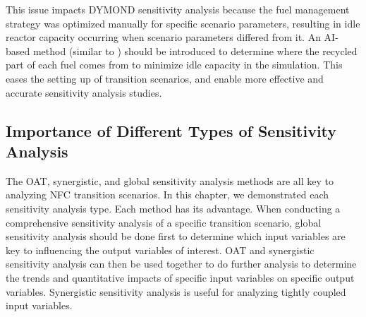 This issue impacts DYMOND sensitivity analysis 
because the fuel management strategy was 
optimized manually for specific scenario parameters, resulting in 
idle reactor capacity occurring when scenario parameters differed 
from it. 
An AI-based method (similar to \deploy) 
should be introduced to 
determine where the recycled part of each fuel comes from to 
minimize idle capacity in the simulation. 
This eases the setting up of transition scenarios, and enable 
more effective and accurate sensitivity analysis studies.

\subsection{Importance of Different Types of Sensitivity Analysis}
The OAT, synergistic, and global sensitivity analysis methods 
are all key to analyzing \gls{NFC} transition scenarios. 
In this chapter, we demonstrated each sensitivity analysis type. 
Each method has its advantage. 
When conducting a comprehensive sensitivity analysis of a specific 
transition scenario, 
global sensitivity analysis should be done first to 
determine which input variables are key to influencing the output 
variables of interest. 
OAT and synergistic sensitivity analysis can then be used together to 
do further analysis to determine the trends and quantitative impacts 
of specific input variables on specific output variables. 
Synergistic sensitivity analysis is useful for analyzing 
tightly coupled input variables.  

